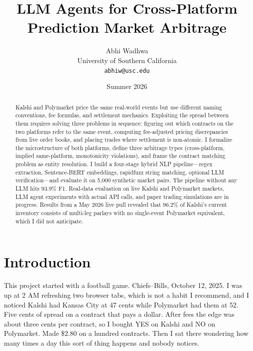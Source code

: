 \documentclass[11pt]{article}
\title{LLM Agents for Cross-Platform Prediction Market Arbitrage}
\author{Abhi Wadhwa\\
University of Southern California\\
\texttt{abhiw@usc.edu}}
\date{Summer 2026}
\theoremstyle{definition}
\theoremstyle{remark}
\begin{document}
\maketitle

\begin{abstract}
Kalshi and Polymarket price the same real-world events but use different naming conventions, fee formulas, and settlement mechanics. Exploiting the spread between them requires solving three problems in sequence: figuring out which contracts on the two platforms refer to the same event, computing fee-adjusted pricing discrepancies from live order books, and placing trades where settlement is non-atomic. I formalize the microstructure of both platforms, define three arbitrage types (cross-platform, implied same-platform, monotonicity violations), and frame the contract matching problem as entity resolution. I build a four-stage hybrid NLP pipeline---regex extraction, Sentence-BERT embeddings, rapidfuzz string matching, optional LLM verification---and evaluate it on 5,000 synthetic market pairs. The pipeline without any LLM hits 93.9\% F1. Real-data evaluation on live Kalshi and Polymarket markets, LLM agent experiments with actual API calls, and paper trading simulations are in progress. Results from a May 2026 live pull revealed that 96.2\% of Kalshi's current inventory consists of multi-leg parlays with no single-event Polymarket equivalent, which I did not anticipate.
\end{abstract}

\section{Introduction}
\label{sec:intro}

This project started with a football game. Chiefs--Bills, October 12, 2025. I was up at 2 AM refreshing two browser tabs, which is not a habit I recommend, and I noticed Kalshi had Kansas City at 47 cents while Polymarket had them at 52. Five cents of spread on a contract that pays a dollar. After fees the edge was about three cents per contract, so I bought YES on Kalshi and NO on Polymarket. Made \$2.80 on a hundred contracts. Then I sat there wondering how many times a day this sort of thing happens and nobody notices.
\end{document}
